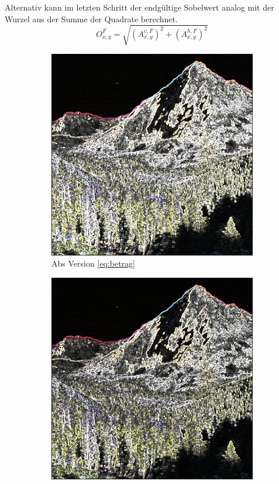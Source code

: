 \documentclass[course=erap]{aspdoc}
\begin{document}
\label{sec:rand}
Alternativ kann im letzten Schritt der endgültige Sobelwert analog mit der Wurzel aus der Summe der Quadrate berechnet.
\begin{equation}
    O^{F}_{x,y} = \sqrt{(A^{v,F}_{x,y})^2 + (A^{h,F}_{x,y})^2}
    \label{eq:wurzel}
\end{equation}
\begin{figure}[H]
    \begin{subfigure}{.5\columnwidth}
        \centering
        \includegraphics[width=\columnwidth]{graphics/johnmuirtrail_sobel.png}
        \caption{Abs Version \ref{eq:betrag}}
        \label{fig:abs-bild}
    \end{subfigure}
        \begin{subfigure}{.5\columnwidth}
        \centering
        \includegraphics[width=\columnwidth]{graphics/sqrt_sobel.png}

\end{subfigure}
\end{figure}
\end{document}
